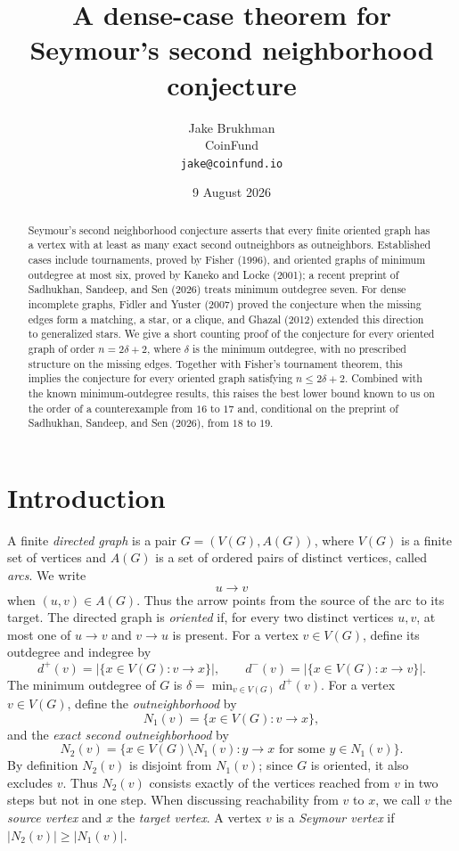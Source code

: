 \documentclass[12pt]{article}
\title{A dense-case theorem for Seymour's second neighborhood conjecture}
\author{Jake Brukhman\\{\small CoinFund}\\{\small\texttt{jake@coinfund.io}}}
\date{9 August 2026}
\theoremstyle{plainsl}
\theoremstyle{remark}
\begin{document}
\maketitle
{\let\thefootnote\relax
{}}

\begin{abstract}
Seymour's second neighborhood conjecture asserts that every finite oriented
graph has a vertex with at least as many exact second outneighbors as
outneighbors.  Established cases include tournaments, proved by Fisher (1996),
and oriented graphs of minimum outdegree at most six, proved by Kaneko and
Locke (2001); a recent preprint of Sadhukhan, Sandeep, and Sen (2026) treats
minimum outdegree seven.  For dense incomplete graphs, Fidler and Yuster (2007) proved
the conjecture when the missing edges form a matching, a star, or a clique,
and Ghazal (2012) extended this direction to generalized stars.  We give a
short counting proof of the conjecture for every oriented graph of order
$n=2\delta+2$, where $\delta$ is the minimum outdegree, with no prescribed
structure on the missing edges.  Together with Fisher's tournament theorem,
this implies the conjecture for every oriented graph satisfying
$n\le2\delta+2$.  Combined with the known minimum-outdegree results, this
raises the best lower bound known to us on the order of a counterexample from
$16$ to $17$ and, conditional on the preprint of Sadhukhan, Sandeep, and Sen
(2026), from $18$ to $19$.
\end{abstract}

\section{Introduction}

A finite \emph{directed graph} is a pair
$G=(V(G),A(G))$, where $V(G)$ is a finite set of vertices and
$A(G)$ is a set of ordered pairs of distinct vertices, called \emph{arcs}.
We write
\[
 u\to v
\]
when $(u,v)\in A(G)$.  Thus the arrow points from the source of the arc to
its target.  The directed graph is \emph{oriented} if, for every two distinct
vertices $u,v$, at most one of $u\to v$ and $v\to u$ is present. For a vertex $v\in V(G)$, define its outdegree and indegree by
\[
 d^+(v)=|\{x\in V(G):v\to x\}|,
 \qquad
 d^-(v)=|\{x\in V(G):x\to v\}|.
\]
The minimum outdegree of $G$ is
$\delta=\min_{v\in V(G)}d^+(v).$ For a vertex $v\in V(G)$, define the \emph{outneighborhood} by
\[
 N_1(v)=\{x\in V(G):v\to x\},
\]
and the \emph{exact second outneighborhood} by
\[
 N_2(v)=
 \{x\in V(G)\setminus N_1(v):
   y\to x\text{ for some }y\in N_1(v)\}.
\]
By definition $N_2(v)$ is disjoint from $N_1(v)$; since $G$ is oriented, it also excludes $v$. Thus $N_2(v)$ consists exactly of the vertices reached from $v$ in two steps but not in one step.  When discussing reachability from $v$ to $x$, we call $v$ the \emph{source vertex} and $x$ the \emph{target vertex}. A vertex $v$ is a \emph{Seymour vertex} if $|N_2(v)|\ge|N_1(v)|.$
\end{document}
